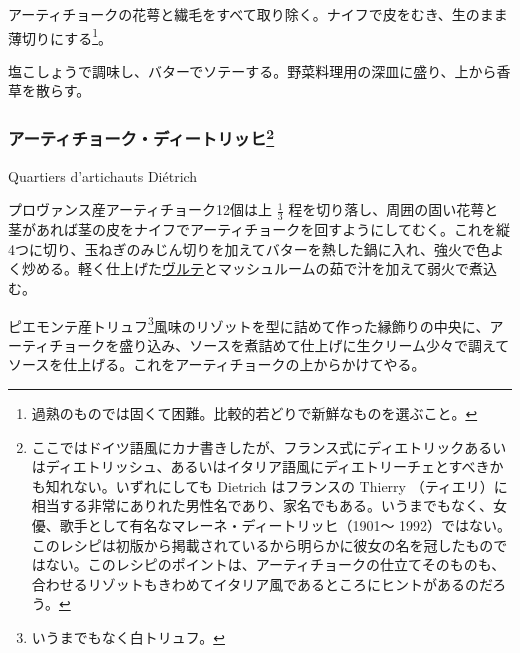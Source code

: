 \begin{recette}
アーティチョークの花萼と繊毛をすべて取り除く。ナイフで皮をむき、生のまま薄切りにする\footnote{過熟のものでは固くて困難。比較的若どりで新鮮なものを選ぶこと。}。

塩こしょうで調味し、バターでソテーする。野菜料理用の深皿に盛り、上から香草を散らす。

\atoaki{}

\hypertarget{quartiers-d-artichauts-dietrich}{%
\subsubsection[アーティチョーク・ディートリッヒ]{\texorpdfstring{アーティチョーク・ディートリッヒ\footnote{ここではドイツ語風にカナ書きしたが、フランス式にディエトリックあるいはディエトリッシュ、あるいはイタリア語風にディエトリーチェとすべきかも知れない。いずれにしても
  Dietrich はフランスの Thierry
  （ティエリ）に相当する非常にありれた男性名であり、家名でもある。いうまでもなく、女優、歌手として有名なマレーネ・ディートリッヒ（1901〜
  1992）ではない。このレシピは初版から掲載されているから明らかに彼女の名を冠したものではない。このレシピのポイントは、アーティチョークの仕立てそのものも、合わせるリゾットもきわめてイタリア風であるところにヒントがあるのだろう。}}{アーティチョーク・ディートリッヒ}}\label{quartiers-d-artichauts-dietrich}}

\begin{frsubenv}

Quartiers d'artichauts Diétrich

\end{frsubenv}


プロヴァンス産アーティチョーク12個は上 \(\frac{1}{3}\)
程を切り落し、周囲の固い花萼と茎があれば茎の皮をナイフでアーティチョークを回すようにしてむく。これを縦4つに切り、玉ねぎのみじん切りを加えてバターを熱した鍋に入れ、強火で色よく炒める。軽く仕上げた\protect\hyperlink{veloute}{ヴルテ}とマッシュルームの茹で汁を加えて弱火で煮込む。

ピエモンテ産トリュフ\footnote{いうまでもなく白トリュフ。}風味のリゾットを型に詰めて作った縁飾りの中央に、アーティチョークを盛り込み、ソースを煮詰めて仕上げに生クリーム少々で調えてソースを仕上げる。これをアーティチョークの上からかけてやる。


\end{recette}
